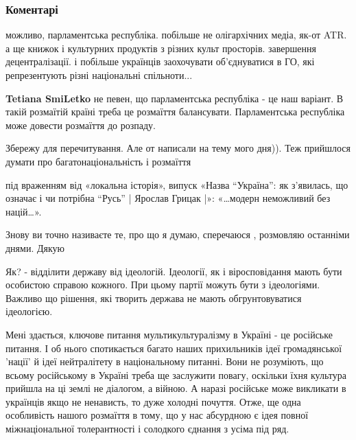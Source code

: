 
 
 
 
 
\subsubsection{Коментарі}
\label{sec:30_09_2021.fb.jermolenko_vladimir.1.raznoobrazie_imperia.cmt}

\begin{itemize} %

можливо, парламентська республіка. побільше не олігархічних медіа, як-от ATR. а
ще книжок і культурних продуктів з різних культ просторів. завершення
децентралізації. і побільше українців заохочувати об’єднуватися в ГО, які
репрезентують різні національні спільноти...

\begin{itemize} %
\textbf{Tetiana SmiLetko} не певен, що парламентська республіка - це наш
варіант. В такій розмаїтій країні треба це розмаїття балансувати. Парламентська
республіка може довести розмаїття до розпаду.
\end{itemize} %

Збережу для перечитування. Але от написали на тему мого дня)). Теж прийшлося думати про багатонаціональність і розмаїття


під враженням від «локальна історія», випуск «Назва “Україна”: як з’явилась, що
означає і чи потрібна “Русь” | Ярослав Грицак |»: «…модерн неможливий без
націй…».


Знову ви точно називаєте те, про що я думаю, сперечаюся , розмовляю останніми днями. Дякую

Як? - відділити державу від ідеологій.
Ідеології, як і віросповідання мають бути особистою справою кожного. При цьому партії можуть бути з ідеологіями. Важливо що рішення, які творить держава не мають обгрунтовуватися ідеологією.


Мені здається, ключове питання мультикультуралізму в Україні - це російське
питання. І об нього спотикається багато наших прихильників ідеї громадянської
'нації' й ідеї нейтралітету в національному питанні. Вони не розуміють, що
всьому російському в Україні треба ще заслужити повагу, оскільки їхня культура
прийшла на ці землі не діалогом, а війною. А наразі російське може викликати в
українців якщо не ненависть, то дуже холодні почуття. Отже, ще одна особливість
нашого розмаїття в тому, що у нас абсурдною є ідея повної міжнаціональної
толерантності і солодкого єднання з усіма під ряд.


\end{itemize}
